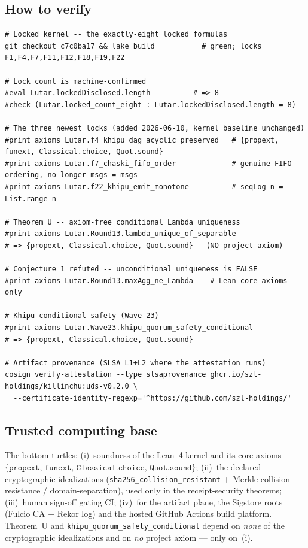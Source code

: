 \documentclass[11pt,letterpaper]{article}
\theoremstyle{definition}
\newcommand{\kernelaxioms}{\{\texttt{propext},\,\texttt{funext},\,\texttt{Classical.choice},\,\texttt{Quot.sound}\}}
\begin{document}
\subsection{How to verify}
\begin{lstlisting}
# Locked kernel -- the exactly-eight locked formulas
git checkout c7c0ba17 && lake build           # green; locks F1,F4,F7,F11,F12,F18,F19,F22

# Lock count is machine-confirmed
#eval Lutar.lockedDisclosed.length          # => 8
#check (Lutar.locked_count_eight : Lutar.lockedDisclosed.length = 8)

# The three newest locks (added 2026-06-10, kernel baseline unchanged)
#print axioms Lutar.f4_khipu_dag_acyclic_preserved   # {propext, funext, Classical.choice, Quot.sound}
#print axioms Lutar.f7_chaski_fifo_order             # genuine FIFO ordering, no longer msgs = msgs
#print axioms Lutar.f22_khipu_emit_monotone          # seqLog n = List.range n

# Theorem U -- axiom-free conditional Lambda uniqueness
#print axioms Lutar.Round13.lambda_unique_of_separable
# => {propext, Classical.choice, Quot.sound}   (NO project axiom)

# Conjecture 1 refuted -- unconditional uniqueness is FALSE
#print axioms Lutar.Round13.maxAgg_ne_Lambda    # Lean-core axioms only

# Khipu conditional safety (Wave 23)
#print axioms Lutar.Wave23.khipu_quorum_safety_conditional
# => {propext, Classical.choice, Quot.sound}

# Artifact provenance (SLSA L1+L2 where the attestation runs)
cosign verify-attestation --type slsaprovenance ghcr.io/szl-holdings/killinchu:uds-v0.2.0 \
  --certificate-identity-regexp='^https://github.com/szl-holdings/'
\end{lstlisting}

\subsection{Trusted computing base}
The bottom turtles: (i)~soundness of the Lean~4 kernel and its core axioms
$\kernelaxioms$; (ii)~the declared cryptographic idealizations
(\texttt{sha256\_collision\_resistant} + Merkle collision-resistance /
domain-separation), used only in the receipt-security theorems; (iii)~human
sign-off gating CI; (iv)~for the artifact plane, the Sigstore roots (Fulcio CA +
Rekor log) and the hosted GitHub Actions build platform. Theorem~U and
\texttt{khipu\_quorum\_safety\_conditional} depend on \emph{none} of the
cryptographic idealizations and on \emph{no} project axiom --- only on~(i).
\end{document}
